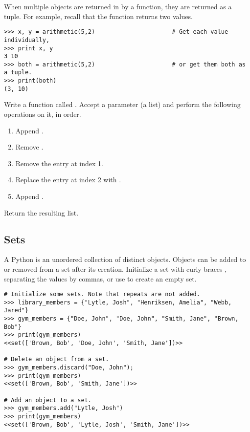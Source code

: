 When multiple objects are returned in by a function, they are returned as a tuple.
For example, recall that the  function returns two values.

\begin{lstlisting}
>>> x, y = arithmetic(5,2)                      # Get each value individually,
>>> print x, y
3 10
>>> both = arithmetic(5,2)                      # or get them both as a tuple.
>>> print(both)
(3, 10)
\end{lstlisting}

\begin{problem} %
Write a function called .
Accept a parameter (a list) and perform the following operations on it, in order.
\begin{enumerate}
\item Append .
\item Remove .
\item Remove the entry at index 1.
\item Replace the entry at index 2 with .
\item Append .
\end{enumerate}
Return the resulting list.
\end{problem}

\subsection*{Sets} %

A Python  is an unordered collection of distinct objects.
Objects can be added to or removed from a set after its creation.
Initialize a set with curly braces \li{\{ \}}, separating the values by commas, or use  to create an empty set.

\begin{lstlisting}
# Initialize some sets. Note that repeats are not added.
>>> library_members = {"Lytle, Josh", "Henriksen, Amelia", "Webb, Jared"}
>>> gym_members = {"Doe, John", "Doe, John", "Smith, Jane", "Brown, Bob"}
>>> print(gym_members)
<<set(['Brown, Bob', 'Doe, John', 'Smith, Jane'])>>

# Delete an object from a set.
>>> gym_members.discard("Doe, John");
>>> print(gym_members)
<<set(['Brown, Bob', 'Smith, Jane'])>>

# Add an object to a set.
>>> gym_members.add("Lytle, Josh")
>>> print(gym_members)
<<set(['Brown, Bob', 'Lytle, Josh', 'Smith, Jane'])>>
\end{lstlisting}


